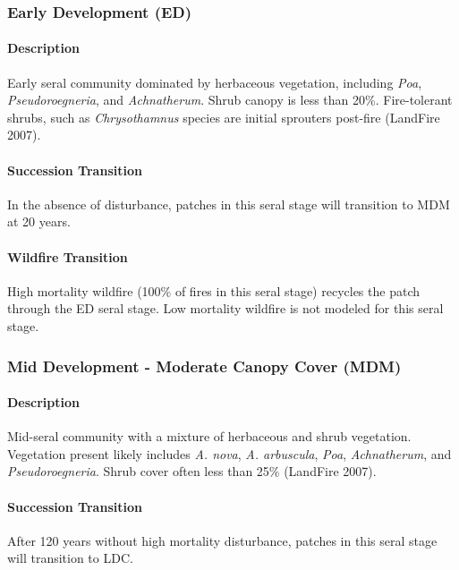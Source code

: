 \subsubsection{Early Development (ED)} 

\paragraph{Description} Early seral community dominated by herbaceous vegetation, including \emph{Poa}, \emph{Pseudoroegneria}, and \emph{Achnatherum}. Shrub canopy is less than 20\%. Fire-tolerant shrubs, such as \emph{Chrysothamnus} species are initial sprouters post-fire (LandFire 2007).

\paragraph{Succession Transition} In the absence of disturbance, patches in this seral stage will transition to MDM at 20 years. 

\paragraph{Wildfire Transition} High mortality wildfire (100\% of fires in this seral stage) recycles the patch through the ED seral stage. Low mortality wildfire is not modeled for this seral stage.

\noindent\hrulefill


\subsubsection{Mid Development - Moderate Canopy Cover (MDM)}

\paragraph{Description} Mid-seral community with a mixture of herbaceous and shrub vegetation. Vegetation present likely includes \emph{A. nova}, \emph{A. arbuscula}, \emph{Poa}, \emph{Achnatherum}, and \emph{Pseudoroegneria}.  Shrub cover often less than 25\% (LandFire 2007).

\paragraph{Succession Transition} After 120 years without high mortality disturbance, patches in this seral stage will transition to LDC. 

